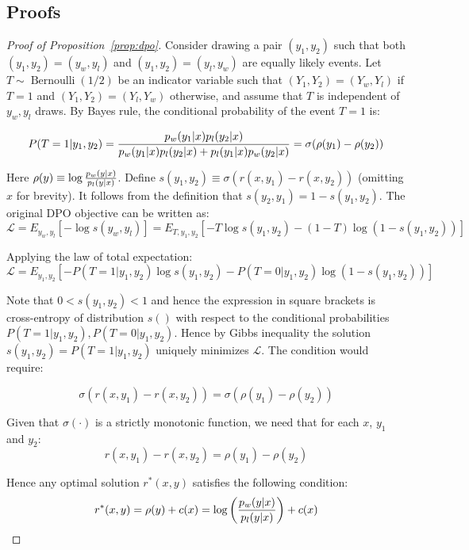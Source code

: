 \documentclass[12pt,a4paper]{article}
\begin{document}
\newpage




\newpage
\begin{appendices}

\section{Proofs}
\label{app:proof}
\begin{proof}[Proof of Proposition~\ref{prop:dpo}]
Consider drawing a pair $(y_1,y_2)$ such that both $(y_1,y_2)=(y_w,y_l)$ and $(y_1,y_2)=(y_l,y_w)$ are equally likely events. Let $T\sim\operatorname{Bernoulli}(1/2)$ be an indicator variable such that \((Y_1,Y_2)=(Y_w,Y_l)\) if \(T=1\) and \((Y_1,Y_2)=(Y_l,Y_w)\) otherwise, and assume that $T$ is independent of $y_w,y_l$ draws. By Bayes rule, the conditional probability of the event $T=1$ is:

$$P(T=1|y_1,y_2)={p_w(y_1|x)p_l(y_2|x) \over p_w(y_1|x)p_l(y_2|x) +p_l(y_1|x)p_w(y_2|x) }=\sigma(\rho(y_1)-\rho(y_2))$$

Here $\rho(y)\equiv \log {p_w(y|x)\over p_l(y|x)}$.  Define $s(y_1,y_2)\equiv\sigma(r(x,y_1)-r(x,y_2))$ (omitting $x$ for brevity). It follows from the definition that $s(y_2,y_1)=1-s(y_1,y_2)$. The original DPO objective can be written as:
$$\mathcal{L}=E_{y_w,y_l}[-\log s(y_w,y_l)]=E_{T,y_1,y_2}[-T\log s(y_1,y_2)-(1-T)\log(1-s(y_1,y_2))]$$

Applying the law of total expectation:
$$\mathcal{L}=E_{y_1,y_2}[-P(T=1|y_1,y_2)\log s(y_1,y_2)-P(T=0|y_1,y_2)\log(1-s(y_1,y_2))]$$

Note that $0<s(y_1,y_2)<1$ and hence the expression in square brackets is cross-entropy of distribution $s()$ with respect to the conditional probabilities $P(T=1|y_1,y_2), P(T=0|y_1,y_2)$. Hence by Gibbs inequality the solution $s(y_1,y_2)=P(T=1|y_1,y_2)$ uniquely minimizes $\mathcal{L}$. The condition would require:

$$\sigma(r(x,y_1)-r(x,y_2))=\sigma(\rho(y_1)-\rho(y_2))$$

Given that $\sigma(\cdot)$ is a strictly monotonic function, we need that for each $x$, $y_1$ and $y_2$:
$$r(x,y_1)-r(x,y_2)=\rho(y_1)-\rho(y_2)$$

Hence any optimal solution $r^*(x,y)$ satisfies the following condition:
\begin{equation}
r^*(x,y)=\rho(y)+c(x)=\log \left({p_w(y|x)\over p_l(y|x)}\right)+c(x)
\end{equation}


\end{proof}
\end{appendices}
\end{document}
